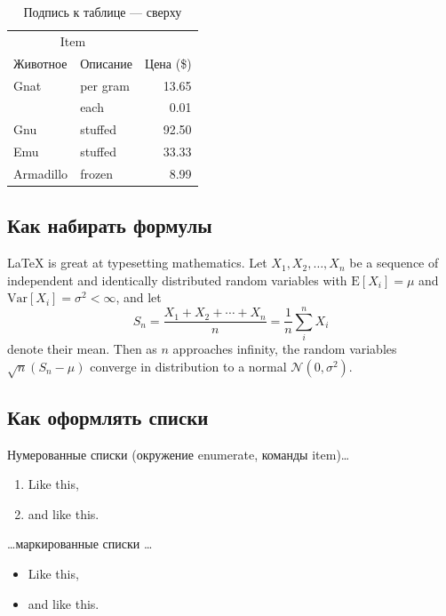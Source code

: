 \begin{table}
\centering
\caption{\label{tab:widgets}Подпись к таблице --- сверху}
\begin{tabular}{llr}
\toprule
\multicolumn{2}{c}{Item} \\
\cmidrule(r){1-2}
Животное  & Описание    & Цена (\$) \\
\midrule
Gnat      & per gram    & 13.65      \\
          & each        & 0.01       \\
Gnu       & stuffed     & 92.50      \\
Emu       & stuffed     & 33.33      \\
Armadillo & frozen      & 8.99       \\
\bottomrule
\end{tabular}
\end{table}

\subsection{Как набирать формулы}

\LaTeX{} is great at typesetting mathematics. Let $X_1, X_2, \ldots, X_n$ be a sequence of independent and identically distributed random variables with $\text{E}[X_i] = \mu$ and $\text{Var}[X_i] = \sigma^2 < \infty$, and let
$$S_n = \frac{X_1 + X_2 + \cdots + X_n}{n}
      = \frac{1}{n}\sum_{i}^{n} X_i$$
denote their mean. Then as $n$ approaches infinity, the random variables $\sqrt{n}(S_n - \mu)$ converge in distribution to a normal $\mathcal{N}(0, \sigma^2)$.

\subsection{Как оформлять списки}

Нумерованные списки (окружение enumerate, команды item)…

\begin{enumerate}
  \item Like this,
  \item and like this.
\end{enumerate}

\dots маркированные списки \dots

\begin{itemize}
  \item Like this,
  \item and like this.
\end{itemize}

